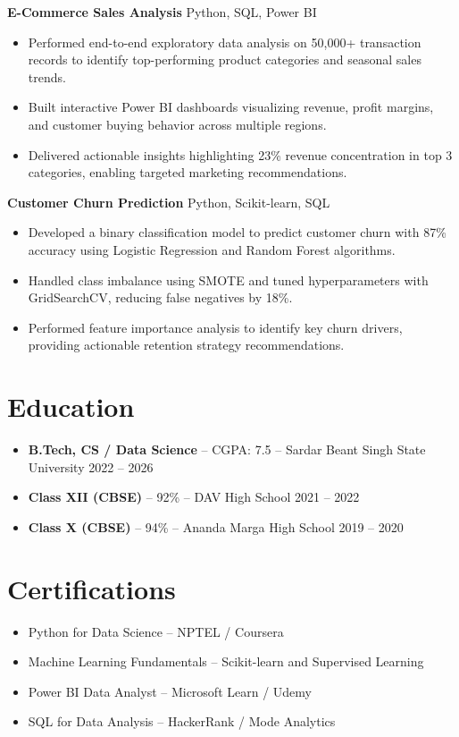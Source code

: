 \documentclass{article}
\begin{document}
\vspace{4pt}

\textbf{E-Commerce Sales Analysis} \hfill Python, SQL, Power BI
\begin{itemize}
    \item Performed end-to-end exploratory data analysis on 50,000+ transaction records to identify top-performing product categories and seasonal sales trends.
    \item Built interactive Power BI dashboards visualizing revenue, profit margins, and customer buying behavior across multiple regions.
    \item Delivered actionable insights highlighting 23\% revenue concentration in top 3 categories, enabling targeted marketing recommendations.
\end{itemize}

\vspace{4pt}

\textbf{Customer Churn Prediction} \hfill Python, Scikit-learn, SQL
\begin{itemize}
    \item Developed a binary classification model to predict customer churn with 87\% accuracy using Logistic Regression and Random Forest algorithms.
    \item Handled class imbalance using SMOTE and tuned hyperparameters with GridSearchCV, reducing false negatives by 18\%.
    \item Performed feature importance analysis to identify key churn drivers, providing actionable retention strategy recommendations.
\end{itemize}

\section*{Education}
\begin{itemize}
    \item \textbf{B.Tech, CS / Data Science} -- CGPA: 7.5 -- Sardar Beant Singh State University \hfill 2022 -- 2026
    \item \textbf{Class XII (CBSE)} -- 92\% -- DAV High School \hfill 2021 -- 2022
    \item \textbf{Class X (CBSE)} -- 94\% -- Ananda Marga High School \hfill 2019 -- 2020
\end{itemize}

\section*{Certifications}
\begin{itemize}
    \item Python for Data Science -- NPTEL / Coursera
    \item Machine Learning Fundamentals -- Scikit-learn and Supervised Learning
    \item Power BI Data Analyst -- Microsoft Learn / Udemy
    \item SQL for Data Analysis -- HackerRank / Mode Analytics
\end{itemize}
\end{document}
